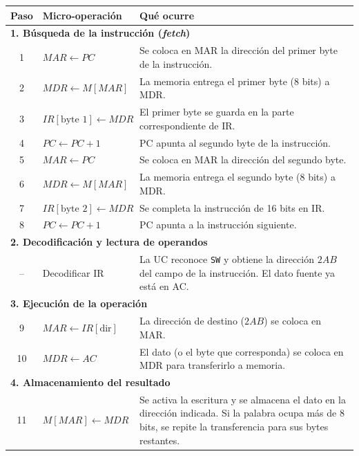 \documentclass[10pt]{article}
\begin{document}
\begingroup
\small
\begin{center}
\begin{tabular}{|c|l|p{6.2cm}|}
  \hline
  \textbf{Paso} & \textbf{Micro-operación} & \textbf{Qué ocurre} \\
  \hline
  \multicolumn{3}{|l|}{\textbf{1. Búsqueda de la instrucción (\emph{fetch})}} \\
  \hline
  1 & $MAR \leftarrow PC$ & Se coloca en MAR la dirección del primer byte de la instrucción. \\
  \hline
  2 & $MDR \leftarrow M[MAR]$ & La memoria entrega el primer byte (8 bits) a MDR. \\
  \hline
  3 & $IR[\text{byte 1}] \leftarrow MDR$ & El primer byte se guarda en la parte correspondiente de IR. \\
  \hline
  4 & $PC \leftarrow PC + 1$ & PC apunta al segundo byte de la instrucción. \\
  \hline
  5 & $MAR \leftarrow PC$ & Se coloca en MAR la dirección del segundo byte. \\
  \hline
  6 & $MDR \leftarrow M[MAR]$ & La memoria entrega el segundo byte (8 bits) a MDR. \\
  \hline
  7 & $IR[\text{byte 2}] \leftarrow MDR$ & Se completa la instrucción de 16 bits en IR. \\
  \hline
  8 & $PC \leftarrow PC + 1$ & PC apunta a la instrucción siguiente. \\
  \hline
  \multicolumn{3}{|l|}{\textbf{2. Decodificación y lectura de operandos}} \\
  \hline
  -- & Decodificar IR & La UC reconoce \texttt{SW} y obtiene la dirección $2AB$ del campo de la instrucción. El dato fuente ya está en AC. \\
  \hline
  \multicolumn{3}{|l|}{\textbf{3. Ejecución de la operación}} \\
  \hline
  9 & $MAR \leftarrow IR[\text{dir}]$ & La dirección de destino ($2AB$) se coloca en MAR. \\
  \hline
  10 & $MDR \leftarrow AC$ & El dato (o el byte que corresponda) se coloca en MDR para transferirlo a memoria. \\
  \hline
  \multicolumn{3}{|l|}{\textbf{4. Almacenamiento del resultado}} \\
  \hline
  11 & $M[MAR] \leftarrow MDR$ & Se activa la escritura y se almacena el dato en la dirección indicada. Si la palabra ocupa más de 8 bits, se repite la transferencia para sus bytes restantes. \\
  \hline
\end{tabular}
\end{center}
\endgroup
 
\end{document}
